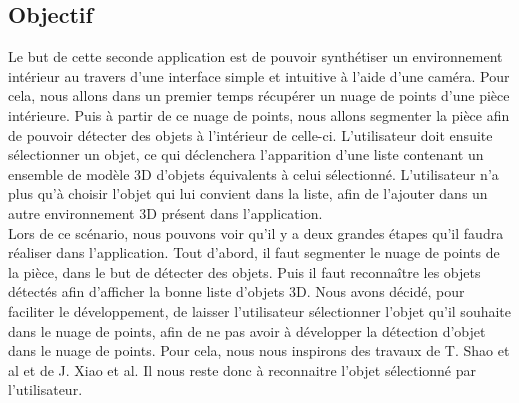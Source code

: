 
\subsection{Objectif}
Le but de cette seconde application est de pouvoir synthétiser un environnement intérieur au travers d'une interface
simple et intuitive à l'aide d'une caméra. 
Pour cela, nous allons dans un premier temps récupérer un nuage de points d'une pièce intérieure. Puis à partir
de ce nuage de points, nous allons segmenter la pièce afin de pouvoir détecter des objets à l'intérieur de celle-ci.
L'utilisateur doit ensuite sélectionner un objet, ce qui déclenchera l'apparition d'une liste contenant un ensemble de modèle 3D
d'objets équivalents à celui sélectionné. L'utilisateur n'a plus qu'à choisir l'objet qui lui convient dans la liste,
afin de l'ajouter dans un autre environnement 3D présent dans l'application.\\

Lors de ce scénario, nous pouvons voir qu'il y a deux grandes étapes qu'il faudra réaliser dans l'application. Tout d'abord, il faut 
segmenter le nuage de points de la pièce, dans le but de détecter des objets. Puis il faut reconnaître les objets détectés afin
d'afficher la bonne liste d'objets 3D. Nous avons décidé, pour faciliter le développement, de laisser l'utilisateur sélectionner
l'objet qu'il souhaite dans le nuage de points, afin de ne pas avoir à développer la détection d'objet dans le nuage de points.
Pour cela, nous nous inspirons des travaux de T. Shao et al\cite{interactiveSeg} et de J. Xiao et al\cite{interactionSeg2}.
Il nous reste donc à reconnaitre l'objet sélectionné par l'utilisateur.

